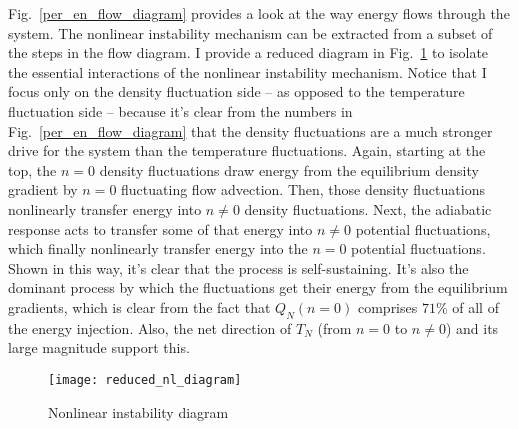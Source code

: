 Fig.~\ref{per_en_flow_diagram} provides a look at the way energy flows through the system. The nonlinear instability mechanism can be extracted from a subset of the steps in the flow diagram.
I provide a reduced diagram in Fig.~\ref{reduced_nl_diagram} to isolate the essential interactions of the nonlinear instability mechanism. Notice that I focus only on the density fluctuation
side -- as opposed to the temperature fluctuation side -- because it's clear from the numbers in Fig.~\ref{per_en_flow_diagram} that the density fluctuations are a much stronger drive for
the system than the temperature fluctuations. Again, starting at the top, the $n=0$ density fluctuations draw energy from the equilibrium density gradient by $n=0$ fluctuating flow advection.
Then, those density fluctuations nonlinearly transfer energy into $n \ne 0$ density fluctuations. Next, the adiabatic response acts to transfer
some of that energy into $n \ne 0$ potential fluctuations, which finally nonlinearly transfer energy into the $n=0$ potential fluctuations.
Shown in this way, it's clear that the process is self-sustaining. It's also the dominant process by which the fluctuations get their energy from the equilibrium gradients, which is clear
from the fact that $Q_N(n=0)$ comprises $71 \%$ of all of the energy injection. Also, the net direction of $T_N$ (from $n=0$ to $n \ne 0$) and its large magnitude support this.
 
\begin{figure}
\centerline{\texttt{[image: reduced\_nl\_diagram]}}
\caption{Nonlinear instability diagram}
\label{reduced_nl_diagram}
\end{figure}

